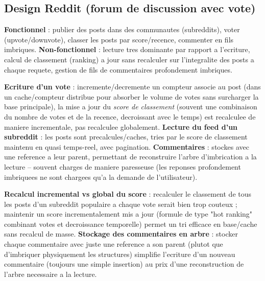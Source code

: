 \documentclass[11pt,a4paper]{article}
\newenvironment{sujet}[1]{%
  \subsection{#1}
}{%
  \bigskip
}
\begin{document}
\begin{sujet}{Design Reddit (forum de discussion avec vote)}

\begin{req}
\textbf{Fonctionnel} : publier des posts dans des communautes (subreddits), voter (upvote/downvote), classer les posts par score/recence, commenter en fils imbriques. \textbf{Non-fonctionnel} : lecture tres dominante par rapport a l'ecriture, calcul de classement (ranking) a jour sans recalculer sur l'integralite des posts a chaque requete, gestion de fils de commentaires profondement imbriques.
\end{req}

\begin{archbox}
\textbf{Ecriture d'un vote} : incremente/decremente un compteur associe au post (dans un cache/compteur distribue pour absorber le volume de votes sans surcharger la base principale), la mise a jour du \emph{score de classement} (souvent une combinaison du nombre de votes et de la recence, decroissant avec le temps) est recalculee de maniere incrementale, pas recalculee globalement. \textbf{Lecture du feed d'un subreddit} : les posts sont precalcules/caches, tries par le score de classement maintenu en quasi temps-reel, avec pagination. \textbf{Commentaires} : stockes avec une reference a leur parent, permettant de reconstruire l'arbre d'imbrication a la lecture -- souvent charges de maniere paresseuse (les reponses profondement imbriquees ne sont chargees qu'a la demande de l'utilisateur).
\end{archbox}

\begin{tradeoff}
\textbf{Recalcul incremental vs global du score} : recalculer le classement de tous les posts d'un subreddit populaire a chaque vote serait bien trop couteux ; maintenir un score incrementalement mis a jour (formule de type "hot ranking" combinant votes et decroissance temporelle) permet un tri efficace en base/cache sans recalcul de masse. \textbf{Stockage des commentaires en arbre} : stocker chaque commentaire avec juste une reference a son parent (plutot que d'imbriquer physiquement les structures) simplifie l'ecriture d'un nouveau commentaire (toujours une simple insertion) au prix d'une reconstruction de l'arbre necessaire a la lecture.
\end{tradeoff}

\end{sujet}
\end{document}
